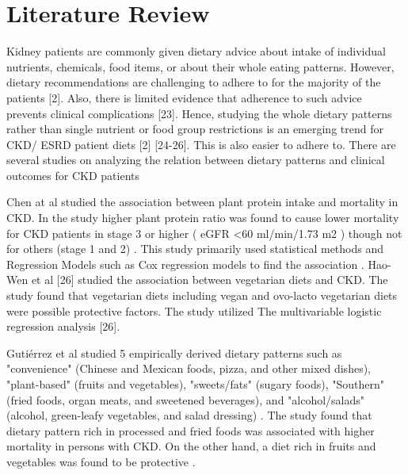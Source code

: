 \section{Literature Review}

Kidney patients are commonly given dietary advice about intake of individual nutrients, chemicals, food items, or about their whole eating patterns. However, dietary recommendations are challenging to adhere to for the majority of the patients [2]. Also, there is limited evidence that adherence to such advice prevents clinical complications [23]. Hence, studying the whole dietary patterns rather than single nutrient or food group restrictions is an emerging trend for CKD/ ESRD patient diets [2] [24-26]. This is also easier to adhere to. There are several studies on analyzing the relation between dietary patterns and clinical outcomes for CKD patients \cite{Jaceketal2017} \cite{Chenetal2016}  \cite{Gutierreztal2014}   \cite{Huangetal2013}   \cite{Muntneretal2013}  \cite{Ricardoetal2013} \cite{Tsuruyaetal2015}   \cite{Ricardoetal2015} 

\noindent Chen at al \cite{Chenetal2016} studied the association between plant protein intake and mortality in CKD. In the study higher plant protein ratio was found to cause lower mortality for CKD patients in stage 3 or higher ( eGFR  \textless 60 ml/min/1.73 m2 ) though not for others (stage 1 and 2) \cite{Chenetal2016}. This study primarily used statistical methods and Regression Models such as Cox regression models to find the association \cite{Chenetal2016}. Hao-Wen et al [26] studied the association between vegetarian diets and CKD. The study found that vegetarian diets including vegan and ovo-lacto vegetarian diets were possible protective factors. The study utilized The multivariable logistic regression analysis [26].

\noindent Gutiérrez et al \cite{Gutierreztal2014} studied 5 empirically derived dietary patterns such as "convenience" (Chinese and Mexican foods, pizza, and other mixed dishes), "plant-based" (fruits and vegetables), "sweets/fats" (sugary foods), "Southern" (fried foods, organ meats, and sweetened beverages), and "alcohol/salads" (alcohol, green-leafy vegetables, and salad dressing) \cite{Gutierreztal2014}. The study found that dietary pattern rich in processed and fried foods was associated with higher mortality in persons with CKD. On the other hand, a diet rich in fruits and vegetables was found to be protective \cite{Gutierreztal2014}.

